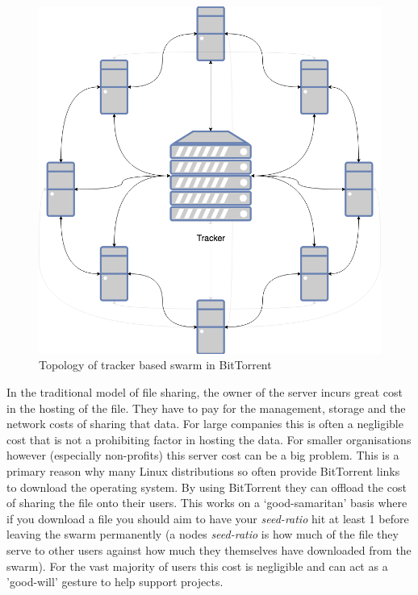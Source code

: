 \begin{figure}
	\begin{center}
		\includegraphics[scale=0.3]{diagrams/bittorrent}
		\caption{Topology of tracker based swarm in BitTorrent}
		\label{fig:bittorrent-tracker}
	\end{center}
\end{figure}

In the traditional model of file sharing, the owner of the server incurs great cost in the hosting of the file. They have to pay for the management, storage and the network costs of sharing that data. For large companies this is often a negligible cost that is not a prohibiting factor in hosting the data. For smaller organisations however (especially non-profits) this server cost can be a big problem. This is a primary reason why many Linux distributions so often provide BitTorrent links to download the operating system. By using BitTorrent they can offload the cost of sharing the file onto their users. This works on a `good-samaritan' basis where if you download a file you should aim to have your \textit{seed-ratio} hit at least 1 before leaving the swarm permanently (a nodes \textit{seed-ratio} is how much of the file they serve to other users against how much they themselves have downloaded from the swarm). For the vast majority of users this cost is negligible and can act as a 'good-will' gesture to help support projects.

